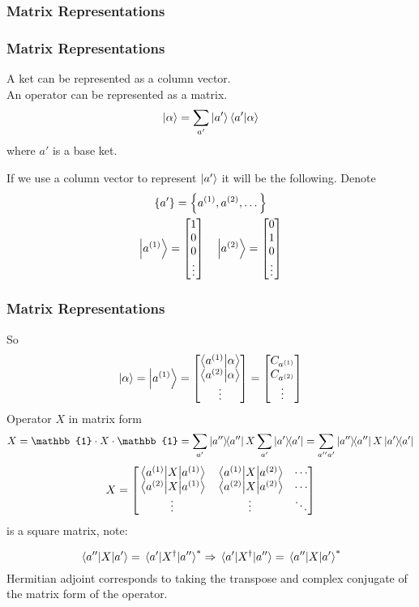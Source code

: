 \subsubsection{Matrix Representations}
\begin{frame}
	\frametitle{Matrix Representations}
	A ket can be represented as a column vector.\\
	An operator can be represented as a matrix.
	\[
		\ket \alpha = \sum_{a'} \ket{a'} \ip{a'}{\alpha}
	\]
	where $a'$ is a base ket.

	If we use a column vector to represent $\ket{a'}$ it will be the following. Denote
	\begin{gather*}
		\qty{a'} = \qty{a^{(1)},a^{(2)},\dots}\\
		\ket{a^{(1)}} = \mqty[1 \\ 0 \\ 0 \\ \vdots] \quad \ket{a^{(2)}} = \mqty[0 \\ 1 \\ 0 \\ \vdots]
	\end{gather*}

\end{frame}
\begin{frame}
	\frametitle{Matrix Representations}

	So
	\[
		\ket{\alpha} = \ket{a^{(1)}} = \mqty[\ip{a^{(1)}}{\alpha} \\ \ip{a^{(2)}}{\alpha} \\ \vdots] = \mqty[C_{a^{(1)}}\\C_{a^{(2)}}\\ \vdots]
	\]
	Operator $X$ in matrix form
	\[
		X = \mathbb{1} \cdot X \cdot \mathbb{1} = \sum_{a'} \op{a''} X\sum_{a'} \op{a'}  = \sum_{a'' a'} \op{a''} X \op{a'}
	\]
	\[
		X = \mqty[
			\ev{X}{a^{(1)}} & \mel{a^{(1)}}{X}{a^{(2)}} & \cdots \\
			\mel{a^{(2)}}{X}{a^{(1)}} & \ev{X}{a^{(2)}} & \cdots \\
			\vdots & \vdots & \ddots
		]
	\]
	is a square matrix, note:

	\[
		\mel{a'' }{X}{a'} = \mel{a'}{X^\dag}{a''}^* \Rightarrow \mel{a'}{X^\dag}{a''} = \mel{a''}{X}{a'}^*
	\]
	Hermitian adjoint corresponds to taking the transpose and complex conjugate of the matrix form of the operator.
\end{frame}

